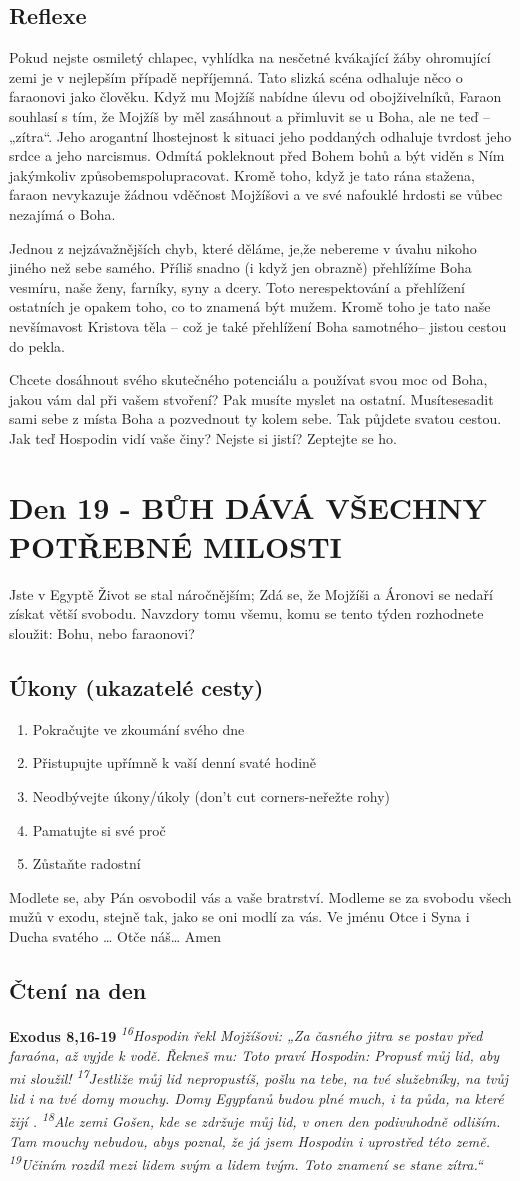 \documentclass[11pt]{article}
\newcommand{\zacatekTretiTyden}{
  Jste v Egyptě \newline
  Život se stal náročnějším; Zdá se, že Mojžíši a Áronovi se nedaří získat větší svobodu. Navzdory tomu všemu,
komu se tento týden rozhodnete sloužit: Bohu, nebo faraonovi?

\subsection*{Úkony (ukazatelé cesty)}
\begin{enumerate}
  \item Pokračujte ve zkoumání svého dne
  \item Přistupujte upřímně k vaší denní svaté hodině
  \item Neodbývejte úkony/úkoly (don’t cut corners-neřežte rohy)
  \item Pamatujte si své proč
  \item Zůstaňte radostní
\end{enumerate}
Modlete se, aby Pán osvobodil vás a vaše bratrství. \newline
Modleme se za svobodu všech mužů v exodu, stejně tak, jako se oni modlí za vás.\newline
Ve jménu Otce i Syna i Ducha svatého …  Otče náš… Amen
}
\begin{document}
\subsection*{Reflexe}

Pokud nejste osmiletý chlapec, vyhlídka na nesčetné kvákající žáby ohromující zemi je v nejlepším případě
nepříjemná. Tato slizká scéna odhaluje něco o faraonovi jako člověku. Když mu Mojžíš nabídne úlevu od
obojživelníků, Faraon souhlasí s tím, že Mojžíš by měl zasáhnout a přimluvit se u Boha, ale ne teď – „zítra“. Jeho
arogantní lhostejnost k situaci jeho poddaných odhaluje tvrdost jeho srdce a jeho narcismus. Odmítá pokleknout
před Bohem bohů a být viděn s Ním jakýmkoliv způsobemspolupracovat. Kromě toho, když je tato rána stažena,
faraon nevykazuje žádnou vděčnost Mojžíšovi a ve své nafouklé hrdosti se vůbec nezajímá o Boha.

Jednou z nejzávažnějších chyb, které děláme, je,že nebereme v úvahu nikoho jiného než sebe samého. Příliš snadno
(i když jen obrazně) přehlížíme Boha vesmíru, naše ženy, farníky, syny a dcery. Toto nerespektování a přehlížení
ostatních je opakem toho, co to znamená být mužem. Kromě toho je tato naše nevšímavost Kristova těla – což je
také přehlížení Boha samotného– jistou cestou do pekla.

Chcete dosáhnout svého skutečného potenciálu a používat svou moc od Boha, jakou vám dal při vašem stvoření?
Pak musíte myslet na ostatní. Musítesesadit sami sebe z místa Boha a pozvednout ty kolem sebe. Tak půjdete
svatou cestou. Jak teď Hospodin vidí vaše činy? Nejste si jistí? Zeptejte se ho.

\newpage
\section{Den 19 - BŮH DÁVÁ VŠECHNY POTŘEBNÉ MILOSTI }
\zacatekTretiTyden
\subsection*{Čtení na den}
\textbf{Exodus 8,16-19}
\newline
\textit{
\textsuperscript{16}Hospodin řekl Mojžíšovi: „Za časného jitra se postav před faraóna, až vyjde k vodě. Řekneš mu: Toto praví Hospodin: Propusť můj lid, aby mi sloužil!
\textsuperscript{17}Jestliže můj lid nepropustíš, pošlu na tebe, na tvé služebníky, na tvůj lid i na tvé domy mouchy. Domy Egypťanů budou plné much, i ta půda, na které žijí .
\textsuperscript{18}Ale zemi Gošen, kde se zdržuje můj lid, v onen den podivuhodně odliším. Tam mouchy nebudou, abys poznal, že já jsem Hospodin i uprostřed této země.
\textsuperscript{19}Učiním rozdíl mezi lidem svým a lidem tvým. Toto znamení se stane zítra.“
  }
\end{document}
